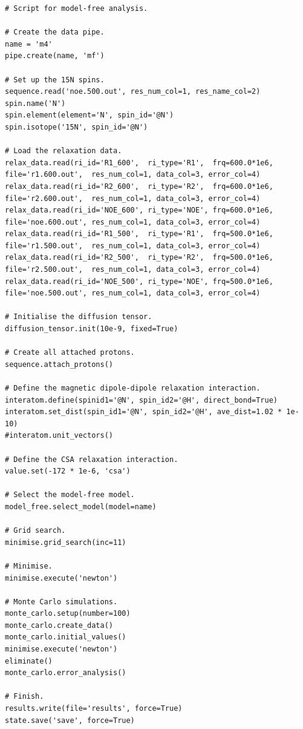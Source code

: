 \begin{lstlisting}
# Script for model-free analysis.

# Create the data pipe.
name = 'm4'
pipe.create(name, 'mf')

# Set up the 15N spins.
sequence.read('noe.500.out', res_num_col=1, res_name_col=2)
spin.name('N')
spin.element(element='N', spin_id='@N')
spin.isotope('15N', spin_id='@N')

# Load the relaxation data.
relax_data.read(ri_id='R1_600',  ri_type='R1',  frq=600.0*1e6, file='r1.600.out',  res_num_col=1, data_col=3, error_col=4)
relax_data.read(ri_id='R2_600',  ri_type='R2',  frq=600.0*1e6, file='r2.600.out',  res_num_col=1, data_col=3, error_col=4)
relax_data.read(ri_id='NOE_600', ri_type='NOE', frq=600.0*1e6, file='noe.600.out', res_num_col=1, data_col=3, error_col=4)
relax_data.read(ri_id='R1_500',  ri_type='R1',  frq=500.0*1e6, file='r1.500.out',  res_num_col=1, data_col=3, error_col=4)
relax_data.read(ri_id='R2_500',  ri_type='R2',  frq=500.0*1e6, file='r2.500.out',  res_num_col=1, data_col=3, error_col=4)
relax_data.read(ri_id='NOE_500', ri_type='NOE', frq=500.0*1e6, file='noe.500.out', res_num_col=1, data_col=3, error_col=4)

# Initialise the diffusion tensor.
diffusion_tensor.init(10e-9, fixed=True)

# Create all attached protons.
sequence.attach_protons()

# Define the magnetic dipole-dipole relaxation interaction.
interatom.define(spinid1='@N', spin_id2='@H', direct_bond=True)
interatom.set_dist(spin_id1='@N', spin_id2='@H', ave_dist=1.02 * 1e-10)
#interatom.unit_vectors()

# Define the CSA relaxation interaction.
value.set(-172 * 1e-6, 'csa')

# Select the model-free model.
model_free.select_model(model=name)

# Grid search.
minimise.grid_search(inc=11)

# Minimise.
minimise.execute('newton')

# Monte Carlo simulations.
monte_carlo.setup(number=100)
monte_carlo.create_data()
monte_carlo.initial_values()
minimise.execute('newton')
eliminate()
monte_carlo.error_analysis()

# Finish.
results.write(file='results', force=True)
state.save('save', force=True)
\end{lstlisting}



